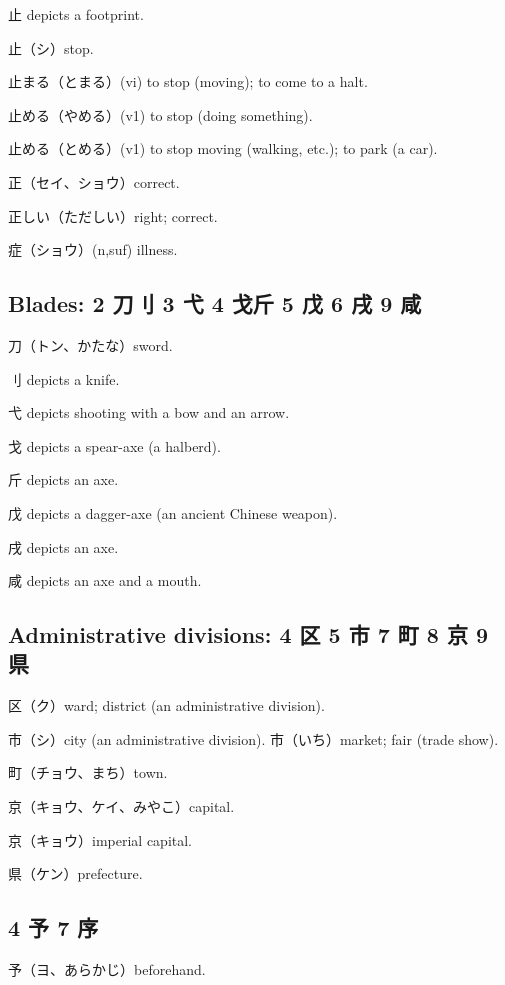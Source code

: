 止 depicts a footprint.

止（シ）stop.

止まる（とまる）(vi) to stop (moving); to come to a halt.

止める（やめる）(v1) to stop (doing something).

止める（とめる）(v1) to stop moving (walking, etc.); to park (a car).

正（セイ、ショウ）correct.

正しい（ただしい）right; correct.

症（ショウ）(n,suf) illness.

\subsection{Blades: 2 刀刂 3 弋 4 戈斤 5 戊 6 戌 9 咸}

刀（トン、かたな）sword.

刂 depicts a knife.

弋 depicts shooting with a bow and an arrow.

戈 depicts a spear-axe (a halberd).

斤 depicts an axe.

戊 depicts a dagger-axe (an ancient Chinese weapon).

戌 depicts an axe.

咸 depicts an axe and a mouth.

\subsection{Administrative divisions: 4 区 5 市 7 町 8 京 9 県}


区（ク）ward; district (an administrative division).

市（シ）city (an administrative division).
市（いち）market; fair (trade show).

町（チョウ、まち）town.

京（キョウ、ケイ、みやこ）capital.

京（キョウ）imperial capital.

県（ケン）prefecture.

\subsection{4 予 7 序}

予（ヨ、あらかじ）beforehand.

